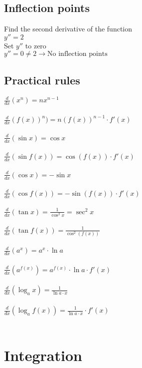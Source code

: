 \documentclass[a4paper, 10pt]{article}
\begin{document}
\subsection{Inflection points}
Find the second derivative of the function\\
$y'' = 2$\\
Set $y''$ to zero\\
$y'' = 0 \neq 2 \rightarrow \text{No inflection points}$

\subsection{Practical rules}
$\frac{d}{dx} (x^n)= nx^{n-1}$\\\\
$\frac{d}{dx} (f(x))^n) = n(f(x))^{n-1} \cdot f'(x)$\\\\
$\frac{d}{dx} (\sin x) = \cos x $\\\\
$\frac{d}{dx} (\sin f(x)) = \cos(f(x)) \cdot f'(x) $\\\\
$\frac{d}{dx} (\cos x) = -\sin x $\\\\
$\frac{d}{dx} (\cos f(x)) = -\sin(f(x)) \cdot f'(x) $\\\\
$\frac{d}{dx} (\tan x) = \frac{1}{\cos^2x} = \sec^2 x$\\\\
$\frac{d}{dx} (\tan f(x)) = \frac{1}{\cos^2(f(x))}$\\\\
$\frac{d}{dx} (a^x) = a^x \cdot \ln a$\\\\
$\frac{d}{dx} (a^{f(x)}) = a^{f(x)} \cdot \ln a \cdot f'(x)$\\\\
$\frac{d}{dx} (\log_ax) = \frac{1}{\ln a \cdot x} $\\\\
$\frac{d}{dx} (\log_af(x)) = \frac{1}{\ln a \cdot x} \cdot f'(x) $\\\\


\section{Integration}
\end{document}

